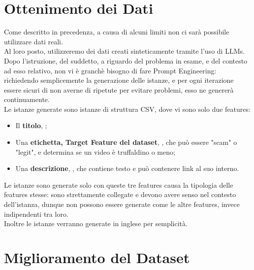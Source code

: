 \documentclass[a4paper,12pt]{report}
\begin{document}
\section{Ottenimento dei Dati}
Come descritto in precedenza, a causa di alcuni limiti non ci sarà possibile utilizzare dati reali.\\
Al loro posto, utilizzeremo dei dati creati sinteticamente tramite l'uso di LLMs.\\
Dopo l'istruzione, del suddetto, a riguardo del problema in esame, e del contesto ad esso relativo, non vi è granchè bisogno di fare Prompt Engineering: richiedendo semplicemente la generazione delle istanze, e per ogni iterazione essere sicuri di non averne di ripetute per evitare problemi, esso ne genererà continuamente.\\
Le istanze generate sono istanze di struttura CSV, dove vi sono solo due features:
\begin{itemize}
        \item Il \textbf{titolo}, \texttt{\color{red}{title}};
        \item Una \textbf{etichetta, Target Feature del dataset}, \texttt{\color{red}{label}}, che può essere "scam" o "legit", e determina se un video è truffaldino o meno;
        \item Una \textbf{descrizione}, \texttt{\color{red}{description}}, che contiene testo e può contenere link al suo interno.
\end{itemize}
Le istanze sono generate solo con queste tre features causa la tipologia delle features stesse: sono strettamente collegate e devono avere senso nel contesto dell'istanza, dunque non possono essere generate come le altre features, invece indipendenti tra loro.\\
Inoltre le istanze verranno generate in inglese per semplicità.

\section{Miglioramento del Dataset}
\end{document}
